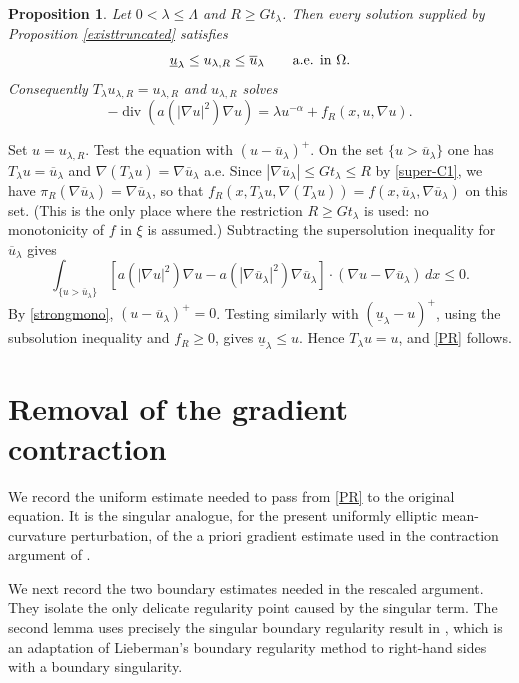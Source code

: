 \documentclass[11pt,leqno]{amsart}
\makeatletter
\newtheorem{proposition}[theorem]{Proposition}
\renewenvironment{proof}[1][\proofname]{%
  \par
  \pushQED{\qed}%
  \normalfont
  \topsep6\p@\@plus6\p@\relax
  \trivlist
  \item[\hskip\labelsep\itshape #1\@addpunct{.}]%
  \hspace{0.5em}\ignorespaces
}{%
  \popQED
  \endtrivlist\@endpefalse
}
\makeatother
\begin{document}
\begin{proposition}\label{location}
Let $0<\lambda\le\Lambda$ and $R\ge Gt_\lambda$. Then every solution
supplied by Proposition \ref{existtruncated} satisfies
\[
\underline u_\lambda\le u_{\lambda,R}\le\overline u_\lambda
\qquad\hbox{a.e. in }\Omega.
\]
Consequently $T_\lambda u_{\lambda,R}=u_{\lambda,R}$ and
$u_{\lambda,R}$ solves
\begin{equation}\label{PR}
-\operatorname{div}\left(a(|\nabla u|^2)\nabla u\right)
=\lambda u^{-\alpha}+f_R(x,u,\nabla u).
\end{equation}
\end{proposition}

\begin{proof}
Set $u=u_{\lambda,R}$.  Test the equation with
$(u-\overline u_\lambda)^+$.  On the set
$\{u>\overline u_\lambda\}$ one has
$T_\lambda u=\overline u_\lambda$ and
$\nabla(T_\lambda u)=\nabla\overline u_\lambda$ a.e.  Since
$|\nabla\overline u_\lambda|\le Gt_\lambda\le R$ by \eqref{super-C1}, we have
$\pi_R(\nabla\overline u_\lambda)=\nabla\overline u_\lambda$, so that
$f_R(x,T_\lambda u,\nabla(T_\lambda u))=f(x,\overline u_\lambda,\nabla\overline u_\lambda)$
on this set.  (This is the only place where the restriction
$R\ge Gt_\lambda$ is used: no monotonicity of $f$ in $\xi$ is assumed.)
Subtracting the supersolution inequality for $\overline u_\lambda$ gives
\[
\int_{\{u>\overline u_\lambda\}}
\left[
a(|\nabla u|^2)\nabla u
-a(|\nabla\overline u_\lambda|^2)\nabla\overline u_\lambda
\right]\cdot
(\nabla u-\nabla\overline u_\lambda)\,dx\le0.
\]
By \eqref{strongmono}, $(u-\overline u_\lambda)^+=0$.  Testing
similarly with $(\underline u_\lambda-u)^+$, using the subsolution
inequality and $f_R\ge0$, gives $\underline u_\lambda\le u$.  Hence
$T_\lambda u=u$, and \eqref{PR} follows.
\end{proof}

\section{Removal of the gradient contraction}\label{S5}

We record the uniform estimate needed to pass from \eqref{PR} to the
original equation.  It is the singular analogue, for the present
uniformly elliptic mean-curvature perturbation, of the a priori gradient
estimate used in the contraction argument of \cite{AFM2024}.


We next record the two boundary estimates needed in the rescaled
argument.  They isolate the only delicate regularity point caused by
the singular term.  The second lemma uses precisely the singular
boundary regularity result in \cite[Theorem B.1]{GiacomoniSchindlerTakac},
which is an adaptation of Lieberman's boundary regularity method
\cite{Lie} to right-hand sides with a boundary singularity.
\end{document}
